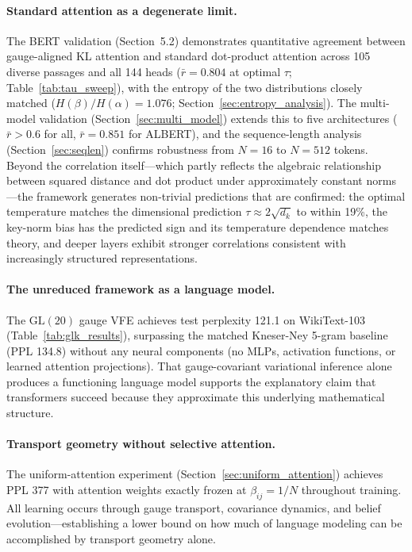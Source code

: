 \documentclass[twoside,11pt]{article}
\begin{document}
\paragraph{Standard attention as a degenerate limit.} The BERT validation (Section~5.2) demonstrates quantitative agreement between gauge-aligned KL attention and standard dot-product attention across 105 diverse passages and all 144 heads ($\bar{r} = 0.804$ at optimal $\tau$; Table~\ref{tab:tau_sweep}), with the entropy of the two distributions closely matched ($H(\beta)/H(\alpha) = 1.076$; Section~\ref{sec:entropy_analysis}). The multi-model validation (Section~\ref{sec:multi_model}) extends this to five architectures ($\bar{r} > 0.6$ for all, $\bar{r} = 0.851$ for ALBERT), and the sequence-length analysis (Section~\ref{sec:seqlen}) confirms robustness from $N = 16$ to $N = 512$ tokens. Beyond the correlation itself---which partly reflects the algebraic relationship between squared distance and dot product under approximately constant norms---the framework generates non-trivial predictions that are confirmed: the optimal temperature matches the dimensional prediction $\tau \approx 2\sqrt{d_k}$ to within 19\%, the key-norm bias has the predicted sign and its temperature dependence matches theory, and deeper layers exhibit stronger correlations consistent with increasingly structured representations.

\paragraph{The unreduced framework as a language model.} The $\mathrm{GL}(20)$ gauge VFE achieves test perplexity 121.1 on WikiText-103 (Table~\ref{tab:glk_results}), surpassing the matched Kneser-Ney 5-gram baseline (PPL 134.8) without any neural components (no MLPs, activation functions, or learned attention projections). That gauge-covariant variational inference alone produces a functioning language model supports the explanatory claim that transformers succeed because they approximate this underlying mathematical structure.

\paragraph{Transport geometry without selective attention.} The uniform-attention experiment (Section~\ref{sec:uniform_attention}) achieves PPL 377 with attention weights exactly frozen at $\beta_{ij} = 1/N$ throughout training. All learning occurs through gauge transport, covariance dynamics, and belief evolution---establishing a lower bound on how much of language modeling can be accomplished by transport geometry alone.
\end{document}
